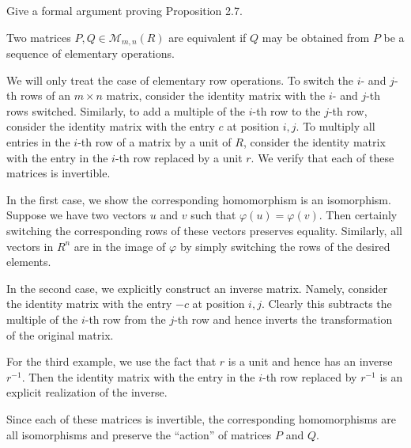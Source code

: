 \documentclass[../../master.tex]{subfiles}
\begin{document}
\begin{problem}
    Give a formal argument proving Proposition 2.7.
    \begin{proposition}[Proposition 2.7] 
        Two matrices $P, Q \in \mathcal{M}_{m, n}(R)$ are equivalent if $Q$ may be obtained from $P$ be a sequence of elementary operations.
    \end{proposition}
\end{problem}

\begin{solution}
    We will only treat the case of elementary row operations.
    To switch the $i$- and $j$-th rows of an $m \times n$ matrix, consider the identity matrix with the $i$- and $j$-th rows switched.
    Similarly, to add a multiple of the $i$-th row to the $j$-th row, consider the identity matrix with the entry $c$ at position $i, j$.
    To multiply all entries in the $i$-th row of a matrix by a unit of $R$, consider the identity matrix with the entry in the $i$-th row replaced by a unit $r$.
    We verify that each of these matrices is invertible.

    In the first case, we show the corresponding homomorphism is an isomorphism. Suppose we have two vectors $u$ and $v$ such that $\varphi(u) = \varphi(v)$.
    Then certainly switching the corresponding rows of these vectors preserves equality.
    Similarly, all vectors in $R^{n}$ are in the image of $\varphi$ by simply switching the rows of the desired elements.

    In the second case, we explicitly construct an inverse matrix.
    Namely, consider the identity matrix with the entry $-c$ at position $i, j$.
    Clearly this subtracts the multiple of the $i$-th row from the $j$-th row and hence inverts the transformation of the original matrix.

    For the third example, we use the fact that $r$ is a unit and hence has an inverse $r^{-1}$.
    Then the identity matrix with the entry in the $i$-th row replaced by $r^{-1}$ is an explicit realization of the inverse.

    Since each of these matrices is invertible, the corresponding homomorphisms are all isomorphisms and preserve the ``action'' of matrices $P$ and $Q$.
\end{solution}
\end{document}
